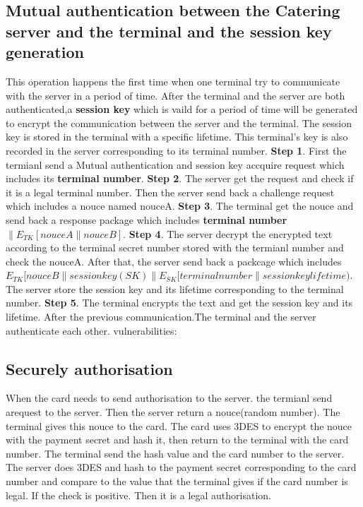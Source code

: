 \documentclass{article}
\begin{document}
        \subsection*{Mutual authentication between the Catering server and the terminal and the session key generation}
This operation happens the first time when one terminal try to communicate with the server in a period of time. After the terminal and the server are both authenticated,a \textbf{session key} which is vaild for a period of time will be generated to encrypt the communication between the server and the terminal. The session key is stored in the terminal with a specific lifetime. This terminal's key is also recorded in the server corresponding to its terminal number. 
        \newline
\textbf{Step 1}. First the termianl send a Mutual authentication and session key accquire request which includes its \textbf{terminal number}.
        \newline
\textbf{Step 2}. The server get the request and check if it is a legal terminal number. Then the server send back a challenge request which includes a nouce named nouceA.
        \newline
\textbf{Step 3}. The terminal get the nouce and send back a response package which includes \textbf{  terminal number $\parallel E_{TK}[nouceA \parallel nouceB]$}. 
        \newline
\textbf{Step 4}. The server decrypt the encrypted text according to the terminal secret number stored with the termianl number and check the nouceA. After that, the server send back a packcage which includes  $E_{TK}[nouceB \parallel  session key(SK) \parallel E_{SK}[terminal number \parallel session key lifetime )$. The server store the session key and its lifetime corresponding to the terminal number.  
        \newline
\textbf{Step 5}. The terminal encrypts the text and get the session key and its lifetime. After the previous communication.The terminal and the server authenticate each other.
        \newline
vulnerabilities: 
        \subsection*{Securely authorisation}
When the card needs to send authorisation to the server. the termianl send arequest to the server. Then the server return a nouce(random number). The terminal gives this nouce to the card. The card uses 3DES to encrypt the nouce with the payment secret and hash it, then return to the terminal with the card number. The terminal send the hash value and the card number to the server. The server does 3DES and hash to the payment secret corresponding to the card number and compare to the value that the terminal gives if the card number is legal. If the check is positive. Then it is a legal authorisation.
    
\end{document}
